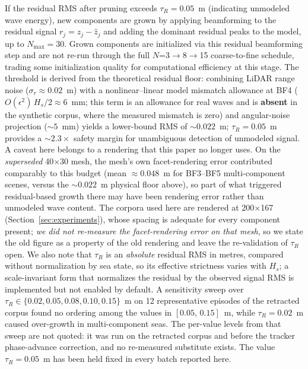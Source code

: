 \documentclass[review]{elsarticle}
\begin{document}
If the residual RMS after pruning exceeds $\tau_R = 0.05$~m
(indicating unmodeled wave energy), new components are grown by
applying beamforming to the residual signal $r_j = z_j - \hat{z}_j$
and adding the dominant residual peaks to the model, up to
$N_{\max}=30$. Grown components are initialized via this residual
beamforming step and are not re-run through the full $N$=3$\to$8$\to$15
coarse-to-fine schedule, trading some initialization quality for
computational efficiency at this stage.
The threshold is derived from the theoretical
residual floor: combining LiDAR range noise ($\sigma_r \approx
0.02$~m) with a nonlinear--linear model mismatch allowance at BF4
($O(\epsilon^2)\,H_s/2 \approx 6$~mm; this term is
an allowance for real waves and is \textbf{absent} in the synthetic corpus,
where the measured mismatch is zero) and angular-noise projection
(${\sim}5$~mm) yields a lower-bound RMS of ${\sim}0.022$~m;
$\tau_R = 0.05$~m provides a ${\sim}2.3\times$ safety margin for
unambiguous detection of unmodeled signal.
A caveat here belongs to a rendering that this paper no longer uses. On the
\emph{superseded} 40$\times$30 mesh, the mesh's own facet-rendering error contributed
comparably to this budget (mean ${\approx}0.048$~m for BF3--BF5 multi-component
scenes, versus the ${\sim}0.022$~m physical floor above), so part of what triggered
residual-based growth there may have been rendering error rather than unmodeled wave
content. The corpora used here are rendered at 200$\times$167
(Section~\ref{sec:experiments}), whose spacing is adequate for every component present;
\emph{we did not re-measure the facet-rendering error on that mesh}, so we state the
old figure as a property of the old rendering and leave the re-validation of $\tau_R$
open.
We also note that $\tau_R$ is an \emph{absolute} residual RMS in metres,
compared without normalization by sea state, so its effective strictness
varies with $H_s$; a scale-invariant form that normalizes the residual by
the observed signal RMS is implemented but not enabled by default.
A sensitivity sweep over $\tau_R \in \{0.02, 0.05, 0.08, 0.10, 0.15\}$~m
on 12 representative episodes of the retracted corpus found no ordering among the
values in $[0.05,\,0.15]$~m, while $\tau_R = 0.02$~m caused over-growth in
multi-component seas. The per-value levels
from that sweep are not quoted: it was run on the retracted corpus and before the
tracker phase-advance correction, and no re-measured substitute exists. %
The value
$\tau_R = 0.05$~m has been held fixed in every batch reported here.
\end{document}
